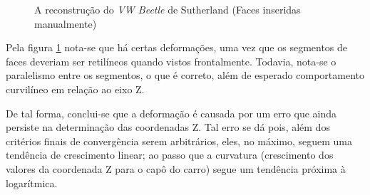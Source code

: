 			\begin{figure}[!htb]
				\centering
				\quad
				\quad
				\caption{A reconstrução do \textit{VW Beetle} de Sutherland (Faces inseridas manualmente)}
				\label{resultadosFuscaTriplo}
			\end{figure}
			
			Pela figura \ref{resultadosFuscaTriplo} nota-se que há certas deformações, uma vez que os segmentos de faces deveriam ser retilíneos quando vistos frontalmente. Todavia, nota-se o paralelismo entre os segmentos, o que é correto, além de esperado comportamento curvilíneo em relação ao eixo Z.
			
			De tal forma, conclui-se que a deformação é causada por um erro que ainda persiste na determinação das coordenadas Z. Tal erro se dá pois, além dos critérios finais de convergência serem arbitrários, eles, no máximo, seguem uma tendência de crescimento linear; ao passo que a curvatura (crescimento dos valores da coordenada Z para o capô do carro) segue um tendência próxima à logarítmica.
			
